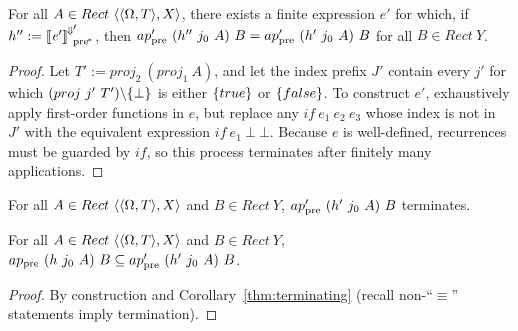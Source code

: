 \begin{theorem}
\label{thm:equivalent-finite-expression}
For all $A \in Rect~\langle{\langle{\Omega,T}\rangle,X}\rangle$,
there exists a finite expression $\mathit{e'}$ for which, if $h'' := {\left\llbracket{\mathit{e'}}\right\rrbracket^{\mspace{-2mu}\Downarrow\mspace{-2mu}}}_\mathrm{pre^{\mspace{-2mu}*}}'$, then $ap_\mathrm{pre}'~(h''~j_0~A)~B = ap_\mathrm{pre}'~(h'~j_0~A)~B$ for all $B \in Rect~Y$.%
\end{theorem}
\begin{proof}
Let $T' := proj_2~(proj_1~A)$, and let the index prefix $J'$ contain every $j'$ for which $(proj~j'~T') \backslash \{{\bot}\}$ is either $\{{true}\}$ or $\{{false}\}$.
To construct $\mathit{e'}$, exhaustively apply first-order functions in $\mathit{e}$, but replace any $if~\mathit{e}_1~\mathit{e}_2~\mathit{e}_3$ whose index is not in $J'$ with the equivalent expression $if~\mathit{e}_1~\bot~\bot$.
Because $\mathit{e}$ is well-defined, recurrences must be guarded by $if$, so this process terminates after finitely many applications.
\end{proof}

\begin{corollary}[terminating]
\label{thm:terminating}
For all $A \in Rect~\langle{\langle{\Omega,T}\rangle,X}\rangle$ and $B \in Rect~Y$, $ap_\mathrm{pre}'~(h'~j_0~A)~B$ terminates.
\end{corollary}

\begin{theorem}[sound]
\label{thm:approximation}
For all $A \in Rect~\langle{\langle{\Omega,T}\rangle,X}\rangle$ and $B \in Rect~Y$, $ap_\mathrm{pre}~(h~j_0~A)~B \subseteq ap_\mathrm{pre}'~(h'~j_0~A)~B$.
\end{theorem}
\begin{proof}
By construction and Corollary~\ref{thm:terminating} (recall non-``$\equiv$'' statements imply termination).
\end{proof}



